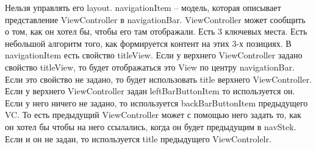 \documentclass{article}
\begin{document}
    \newline
    Нельзя управлять его layout. navigationItem -- модель, которая описывает представление ViewController в navigationBar. ViewController может сообщить о том, как он хотел бы, чтобы его там отображали. Есть 3 ключевых места. Есть небольшой алгоритм того, как формируется контент на этих 3-х позициях.
    \newline
    В navigationItem есть свойство titleView. Если у верхнего ViewController задано свойство titleView, то будет отображаться это View по центру navigationBar. Если это свойство не задано, то будет использовать title верхнего ViewController.
    \newline
    Если у верхнего ViewController задан leftBarButtonItem то используется он. Если у него ничего не задано, то используется backBarButtonItem предыдущего VC. То есть предыдущий ViewController может с помощью него задать то, как он хотел бы чтобы на него ссылались, когда он будет предыдущим в navStek. Если и он не задан, то используется title предыдущего ViewControlelr.
\end{document}

